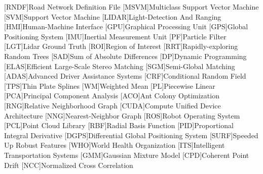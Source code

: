 [RNDF]{Road Network Definition File}
[MSVM]{Multiclass Support Vector Machine}
[SVM]{Support Vector Machine}
[LIDAR]{Light-Detection And Ranging}
[HMI]{Human-Machine Interface}
[GPU]{Graphical Processing Unit}
[GPS]{Global Positioning System}
[IMU]{Inertial Measurement Unit}
[PF]{Particle Filter}
[LGT]{Lidar Ground Truth}
[ROI]{Region of Interest}
[RRT]{Rapidly-exploring Random Trees}
[SAD]{Sum of Absolute Differences}
[DP]{Dynamic Programming}
[ELAS]{Efficient Large-Scale Stereo Matching}
[SGM]{Semi-Global Matching}
[ADAS]{Advanced Driver Assistance Systems}
[CRF]{Conditional Random Field}
[TPS]{Thin Plate Splines}
[WM]{Weighted Mean}
[PL]{Piecewise Linear}
[PCA]{Principal Component Analysis}
[ACO]{Ant Colony Optimization}
[RNG]{Relative Neighborhood Graph}
[CUDA]{Compute Unified Device Architecture}
[NNG]{Nearest-Neighbor Graph}
[ROS]{Robot Operating System}
[PCL]{Point Cloud Library}
[RBF]{Radial Basis Function}
[PID]{Proportional Integral Derivative}
[DGPS]{Differential Global Positioning System}
[SURF]{Speeded Up Robust Features}
[WHO]{World Health Organization}
[ITS]{Intelligent Transportation Systems}
[GMM]{Gaussian Mixture Model}
[CPD]{Coherent Point Drift}
[NCC]{Normalized Cross Correlation}


